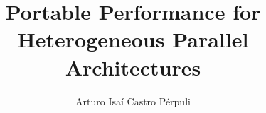 \documentclass[12pt,MSc,twoside]{muthesis}
\begin{document}


\title{Portable Performance for \\
  Heterogeneous Parallel Architectures}
\author{Arturo Isa\'i Castro P\'erpuli}

\beforeabstract



\afterabstract


\printglossary










%
\printbibliography

\appendix


\end{document}
